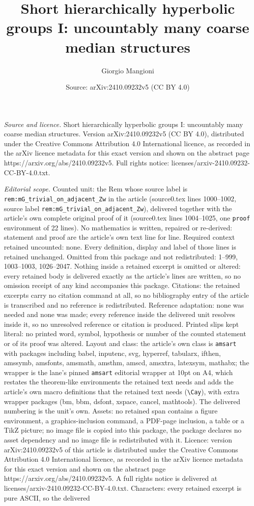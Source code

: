 \documentclass[10pt,a4paper]{amsart}
\title[Short hierarchically hyperbolic groups I: uncountably many c]{Short hierarchically hyperbolic groups I: uncountably many coarse median structures}
\author{Giorgio Mangioni}
\date{Source: arXiv:2410.09232v5 (CC BY 4.0)}
\begin{document}
\maketitle

\noindent\emph{Source and licence.} Short hierarchically hyperbolic groups I: uncountably many coarse median structures. Version arXiv:2410.09232v5 (CC BY 4.0), distributed under the Creative Commons Attribution 4.0 International licence, as recorded in the arXiv licence metadata for this exact version and shown on the abstract page https://arxiv.org/abs/2410.09232v5. Full rights notice: licenses/arxiv-2410.09232-CC-BY-4.0.txt.\par\smallskip

\noindent\textit{Editorial scope.} Counted unit: the Rem whose source label is \texttt{rem:mG\_trivial\_on\_adjacent\_Zw} in the article (source0.tex lines 1000--1002, source label \texttt{rem:mG\_trivial\_on\_adjacent\_Zw}), delivered together with the article's own complete original proof of it (source0.tex lines 1004--1025, one \texttt{proof} environment of 22 lines). No mathematics is written, repaired or re-derived: statement and proof are the article's own text line for line. Required context retained uncounted: none. Every definition, display and label of those lines is retained unchanged. Omitted from this package and not redistributed: 1--999, 1003--1003, 1026--2047. Nothing inside a retained excerpt is omitted or altered: every retained body is delivered exactly as the article's lines are written, so no omission receipt of any kind accompanies this package. Citations: the retained excerpts carry no citation command at all, so no bibliography entry of the article is transcribed and no reference is redistributed. Reference adaptation: none was needed and none was made; every reference inside the delivered unit resolves inside it, so no unresolved reference or citation is produced. Printed slips kept literal: no printed word, symbol, hypothesis or number of the counted statement or of its proof was altered. Layout and class: the article's own class is \texttt{amsart} with packages including babel, inputenc, svg, hyperref, tabularx, ifthen, amssymb, amsfonts, amsmath, amsthm, amscd, amsxtra, latexsym, mathabx; the wrapper is the lane's pinned \texttt{amsart} editorial wrapper at 10pt on A4, which restates the theorem-like environments the retained text needs and adds the article's own macro definitions that the retained text needs (\texttt{\textbackslash Cay}), with extra wrapper packages (bm, bbm, dsfont, xspace, cancel, mathtools). The delivered numbering is the unit's own. Assets: no retained span contains a figure environment, a graphics-inclusion command, a PDF-page inclusion, a table or a TikZ picture; no image file is copied into this package, the package declares no asset dependency and no image file is redistributed with it. Licence: version arXiv:2410.09232v5 of this article is distributed under the Creative Commons Attribution 4.0 International licence, as recorded in the arXiv licence metadata for this exact version and shown on the abstract page https://arxiv.org/abs/2410.09232v5. A full rights notice is delivered at licenses/arxiv-2410.09232-CC-BY-4.0.txt. Characters: every retained excerpt is pure ASCII, so the delivered 
\end{document}
